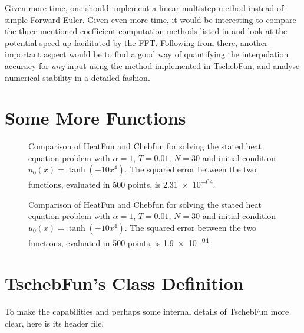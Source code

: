\documentclass[12pt, a4paper]{article}
\newcommand{\tschebfun}{\textcolor{themecolor3}{TschebFun}\xspace}
\newcommand{\heatfun}{\textcolor{themecolor3}{HeatFun}\xspace}
\begin{document}
  Given more time, one should implement a linear multistep method instead of simple Forward Euler.
  Given even more time, it would be interesting to compare the three mentioned coefficient computation methods listed in  and look at the potential speed-up facilitated by the FFT.
  Following from there, another important aspect would be to find a good way of quantifying the interpolation accuracy for \textit{any} input using the method implemented in \tschebfun, and analyse numerical stability in a detailed fashion.

  \pagebreak
  \printbibliography

  \appendix
  \section{Some More Functions}
  \begin{figure}[H]
    \centering
    \caption{Comparison of \heatfun and Chebfun for solving the stated heat equation problem with $\alpha = 1$, $T = 0.01$, $N = 30$ and initial condition $u_0(x) = \tanh(-10x^4)$. The squared error between the two functions, evaluated in 500 points, is \num{2.31e-04}.}
  \end{figure}

  \begin{figure}[H]
    \centering
    \caption{Comparison of \heatfun and Chebfun for solving the stated heat equation problem with $\alpha = 1$, $T = 0.01$, $N = 30$ and initial condition $u_0(x) = \tanh(-10x^4)$. The squared error between the two functions, evaluated in 500 points, is \num{1.9e-04}.}
  \end{figure}

  \section{TschebFun's Class Definition}
  To make the capabilities and perhaps some internal details of \tschebfun more clear, here is its header file.
  \inputminted{cpp}{../solver/TschebFun.h}
\end{document}
